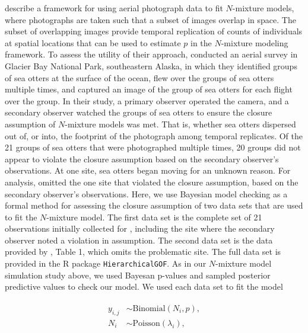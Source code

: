 \documentclass[12pt,english]{article}
\begin{document}
\begin{spacing}{1.9}
    \cite{williams2017estimating} describe a framework for using
    aerial photograph data to fit $N$-mixture models, where
    photographs are taken such that a subset of images overlap in
    space. The subset of overlapping images provide temporal
    replication of counts of individuals at spatial locations that can
    be used to estimate $p$ in the $N$-mixture modeling framework. To
    assess the utility of their approach,
    \cite{williams2017estimating} conducted an aerial survey in
    Glacier Bay National Park, southeastern Alaska, in which they
    identified groups of sea otters at the surface of the ocean, flew
    over the groups of sea otters multiple times, and captured an
    image of the group of sea otters for each flight over the
    group. In their study, a primary observer operated the camera, and
    a secondary observer watched the groups of sea otters to ensure
    the closure assumption of $N$-mixture models was met. That is,
    whether sea otters dispersed out of, or into, the footprint of the
    photograph among temporal replicates. Of the 21 groups of sea
    otters that were photographed multiple times, 20 groups did not
    appear to violate the closure assumption based on the secondary
    observer's observations. At one site, sea otters began moving for
    an unknown reason. For analysis, \citet{williams2017estimating}
    omitted the one site that violated the closure assumption, based
    on the secondary observer's observations. Here, we use Bayesian
    model checking as a formal method for assessing the closure
    assumption of two data sets that are used to fit the $N$-mixture
    model. The first data set is the complete set of 21 observations
    initially collected for \citet{williams2017estimating},
    including the site where the secondary observer noted a violation
    in assumption. The second data set is the data provided by
    \citet{williams2017estimating}, Table 1, which omits the
    problematic site. The full data set is provided in the R package
    \texttt{HierarchicalGOF}. As in our $N$-mixture model simulation
    study above, we used Bayesan p-values and sampled posterior
    predictive values to check our model. We used each data set to fit
    the model
    \begin{linenomath}
      \begin{align}
        \begin{split}
          y_{i,j} & \sim \text{Binomial}(N_{i},p),\\
          N_{i} & \sim \text{Poisson}(\lambda_{i}), \\

\end{split}
\end{align}
\end{linenomath}
\end{spacing}
\end{document}
